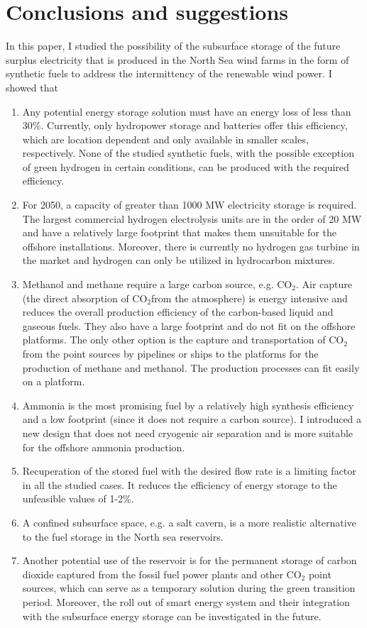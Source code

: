 \documentclass{ECOS_2021}
\begin{document}
\sffamily \section{Conclusions and suggestions}
\normalsize
In this paper, I studied the possibility of the subsurface storage
of the future surplus electricity that is produced in the North Sea
wind farms in the form of synthetic fuels to address the intermittency of the renewable
wind power. I showed that 
\begin{enumerate}
\item Any potential energy storage solution must have an energy loss of
less than 30\%. Currently, only hydropower storage and batteries offer
this efficiency, which are location dependent and only available in
smaller scales, respectively. None of the studied synthetic fuels,
with the possible exception of green hydrogen in certain conditions,
can be produced with the required efficiency.
\item For 2050, a capacity of greater than 1000 MW electricity storage is
required. The largest commercial hydrogen electrolysis units are in
the order of 20 MW and have a relatively large footprint that makes
them unsuitable for the offshore installations. Moreover, there is
currently no hydrogen gas turbine in the market and hydrogen can only
be utilized in hydrocarbon mixtures. 
\item Methanol and methane require a large carbon source, e.g. CO$_{2}$.
Air capture (the direct absorption of CO$_{2}$from the atmosphere)
is energy intensive and reduces the overall production efficiency
of the carbon-based liquid and gaseous fuels. They also have a large
footprint and do not fit on the offshore platforms. The only other
option is the capture and transportation of CO$_{2}$ from the point
sources by pipelines or ships to the platforms for the production
of methane and methanol. The production processes can fit easily on
a platform. 
\item Ammonia is the most promising fuel by a relatively high synthesis
efficiency and a low footprint (since it does not require a carbon
source). I introduced a new design that does not need cryogenic air
separation and is more suitable for the offshore ammonia production. 
\item Recuperation of the stored fuel with the desired flow rate is a limiting
factor in all the studied cases. It reduces the efficiency of energy
storage to the unfeasible values of 1-2\%. 
\item A confined subsurface space, e.g. a salt cavern, is a more realistic
alternative to the fuel storage in the North sea reservoirs.
\item Another potential use of the reservoir is for the permanent storage of carbon dioxide
captured from the fossil fuel power plants and other CO$_2$ point sources,
which can serve as a temporary solution during the green transition period. Moreover, the roll out 
of smart energy system and their integration with the subsurface energy storage 
can be investigated in the future.
\end{enumerate}
\end{document}
